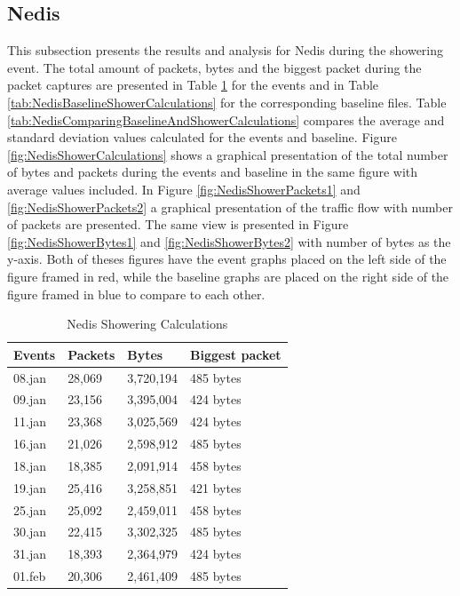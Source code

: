 \newpage
\subsection{Nedis}
This subsection presents the results and analysis for Nedis during the showering event. The total amount of packets, bytes and the biggest packet during the packet captures are presented in Table \ref{tab:NedisShoweringCalculations} for the events and in Table \ref{tab:NedisBaselineShowerCalculations} for the corresponding baseline files. Table \ref{tab:NedisComparingBaselineAndShowerCalculations} compares the average and standard deviation values calculated for the events and baseline. Figure \ref{fig:NedisShowerCalculations} shows a graphical presentation of the total number of bytes and packets during the events and baseline in the same figure with average values included. In Figure \ref{fig:NedisShowerPackets1} and \ref{fig:NedisShowerPackets2} a graphical presentation of the traffic flow with number of packets are presented. The same view is presented in Figure \ref{fig:NedisShowerBytes1} and \ref{fig:NedisShowerBytes2} with number of bytes as the y-axis. Both of theses figures have the event graphs placed on the left side of the figure framed in red, while the baseline graphs are placed on the right side of the figure framed in blue to compare to each other. 

\begin{table}[H]
\centering
\caption{Nedis Showering Calculations}
\label{tab:NedisShoweringCalculations}
    \begin{tabular}{|l|l|l|l|}
        \hline
        \textbf{Events} & \textbf{Packets} & \textbf{Bytes} & \textbf{Biggest packet} \\ \hline
        08.jan          & 28,069           & 3,720,194      & 485 bytes               \\ \hline
        09.jan          & 23,156           & 3,395,004      & 424 bytes               \\ \hline
        11.jan          & 23,368           & 3,025,569      & 424 bytes               \\ \hline
        16.jan          & 21,026           & 2,598,912      & 485 bytes               \\ \hline
        18.jan          & 18,385           & 2,091,914      & 458 bytes               \\ \hline
        19.jan          & 25,416           & 3,258,851      & 421 bytes               \\ \hline
        25.jan          & 25,092           & 2,459,011      & 458 bytes               \\ \hline
        30.jan          & 22,415           & 3,302,325      & 485 bytes               \\ \hline
        31.jan          & 18,393           & 2,364,979      & 424 bytes               \\ \hline
        01.feb          & 20,306           & 2,461,409      & 485 bytes               \\ \hline
    \end{tabular}
\end{table}

